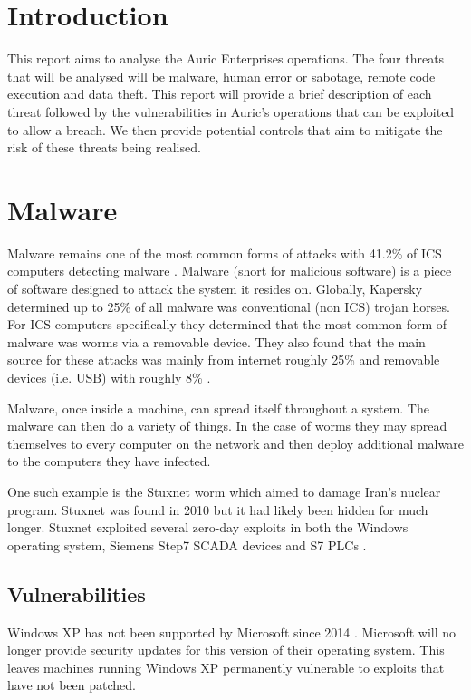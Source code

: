 \documentclass{article}
\begin{document}
\begin{multicols}{2}
    \section{Introduction}
    This report aims to analyse the Auric Enterprises operations.
    The four threats that will be analysed will be malware, human error or sabotage, 
    remote code execution and data theft. This report will provide a brief
    description of each threat followed by the vulnerabilities in Auric's operations
    that can be exploited to allow a breach. We then provide potential
    controls that aim to mitigate the risk of these threats being
    realised.

    \section{Malware}
    Malware remains one of the most common forms of attacks with 41.2\% of ICS
    computers detecting malware \cite{kapersky}.
    Malware (short for malicious software) is a piece of software designed to attack
    the system it resides on. 
    Globally,
    Kapersky determined up to 25\% of all malware was conventional (non ICS) trojan
    horses.
    For ICS computers specifically they determined that the most common form of
    malware was worms via a removable device.
    They also found that the main source for these attacks was mainly from internet
    roughly 25\% and removable devices (i.e. USB) with roughly 8\% \cite{kapersky}.

    Malware, once inside a machine,
    can spread itself throughout a system. The malware can then
    do a variety of things. 
    In the case of worms they may spread themselves to every
    computer on the network and then deploy additional malware to the computers
    they have infected.
    
    One such example is the Stuxnet worm which aimed to damage Iran's nuclear
    program. Stuxnet was found in 2010 but it had likely been hidden for much
    longer. Stuxnet exploited several zero-day 
    exploits in both the Windows operating
    system, Siemens Step7 SCADA devices and S7 PLCs \cite{stuxnet}.

    \subsection{Vulnerabilities}
    Windows XP has not been supported by Microsoft since 2014 \cite{windowsxp}.
    Microsoft will no longer provide security updates for this version of their
    operating system. This leaves machines running Windows XP permanently 
    vulnerable to exploits that have not been patched.


\end{multicols}
\end{document}
